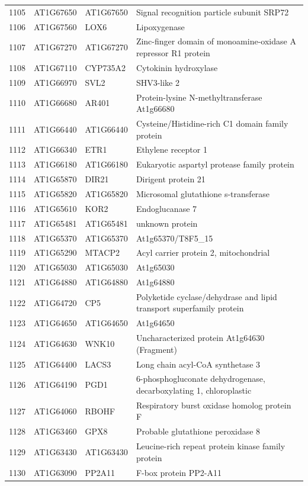 \documentclass[11pt]{article}
\begin{document}
\begin{center}
\begin{tabular}{rlll}
1105 & AT1G67650 & AT1G67650 & Signal recognition particle subunit SRP72\\
1106 & AT1G67560 & LOX6 & Lipoxygenase\\
1107 & AT1G67270 & AT1G67270 & Zinc-finger domain of monoamine-oxidase A repressor R1 protein\\
1108 & AT1G67110 & CYP735A2 & Cytokinin hydroxylase\\
1109 & AT1G66970 & SVL2 & SHV3-like 2\\
1110 & AT1G66680 & AR401 & Protein-lysine N-methyltransferase At1g66680\\
1111 & AT1G66440 & AT1G66440 & Cysteine/Histidine-rich C1 domain family protein\\
1112 & AT1G66340 & ETR1 & Ethylene receptor 1\\
1113 & AT1G66180 & AT1G66180 & Eukaryotic aspartyl protease family protein\\
1114 & AT1G65870 & DIR21 & Dirigent protein 21\\
1115 & AT1G65820 & AT1G65820 & Microsomal glutathione s-transferase\\
1116 & AT1G65610 & KOR2 & Endoglucanase 7\\
1117 & AT1G65481 & AT1G65481 & unknown protein\\
1118 & AT1G65370 & AT1G65370 & At1g65370/T8F5\_15\\
1119 & AT1G65290 & MTACP2 & Acyl carrier protein 2, mitochondrial\\
1120 & AT1G65030 & AT1G65030 & At1g65030\\
1121 & AT1G64880 & AT1G64880 & At1g64880\\
1122 & AT1G64720 & CP5 & Polyketide cyclase/dehydrase and lipid transport superfamily protein\\
1123 & AT1G64650 & AT1G64650 & At1g64650\\
1124 & AT1G64630 & WNK10 & Uncharacterized protein At1g64630 (Fragment)\\
1125 & AT1G64400 & LACS3 & Long chain acyl-CoA synthetase 3\\
1126 & AT1G64190 & PGD1 & 6-phosphogluconate dehydrogenase, decarboxylating 1, chloroplastic\\
1127 & AT1G64060 & RBOHF & Respiratory burst oxidase homolog protein F\\
1128 & AT1G63460 & GPX8 & Probable glutathione peroxidase 8\\
1129 & AT1G63430 & AT1G63430 & Leucine-rich repeat protein kinase family protein\\
1130 & AT1G63090 & PP2A11 & F-box protein PP2-A11\\

\end{tabular}
\end{center}
\end{document}
